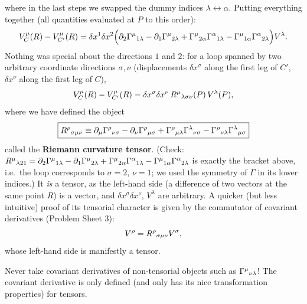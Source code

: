 where in the last steps we swapped the dummy indices $\lambda\leftrightarrow\alpha$. Putting everything together (all quantities evaluated at $P$ to this order):
\begin{equation}
  V_C^\mu(R)-V_{C'}^\mu(R)=\delta x^1\delta x^2\Big(\partial_2\Gamma^{\mu}{}_{1\lambda}-\partial_1\Gamma^{\mu}{}_{2\lambda}+\Gamma^{\mu}{}_{2\alpha}\Gamma^{\alpha}{}_{1\lambda}-\Gamma^{\mu}{}_{1\alpha}\Gamma^{\alpha}{}_{2\lambda}\Big)V^\lambda .
\end{equation}
Nothing was special about the directions $1$ and $2$: for a loop spanned by two arbitrary coordinate directions $\sigma,\nu$ (displacements $\delta x^\sigma$ along the first leg of $C'$, $\delta x^\nu$ along the first leg of $C$),
\begin{equation}
  V_C^\mu(R)-V_{C'}^\mu(R)=\delta x^\sigma\delta x^\nu\,R^{\mu}{}_{\lambda\sigma\nu}(P)\,V^\lambda(P),
\end{equation}
where we have defined the object
\begin{equation}
  \boxed{R^{\rho}{}_{\sigma\mu\nu}\equiv\partial_\mu\Gamma^{\rho}{}_{\nu\sigma}-\partial_\nu\Gamma^{\rho}{}_{\mu\sigma}+\Gamma^{\rho}{}_{\mu\lambda}\Gamma^{\lambda}{}_{\nu\sigma}-\Gamma^{\rho}{}_{\nu\lambda}\Gamma^{\lambda}{}_{\mu\sigma}}
  \label{eq:riemann}
\end{equation}
called the \textbf{Riemann curvature tensor}. (Check: $R^{\mu}{}_{\lambda21}=\partial_2\Gamma^{\mu}{}_{1\lambda}-\partial_1\Gamma^{\mu}{}_{2\lambda}+\Gamma^{\mu}{}_{2\alpha}\Gamma^{\alpha}{}_{1\lambda}-\Gamma^{\mu}{}_{1\alpha}\Gamma^{\alpha}{}_{2\lambda}$ is exactly the bracket above, i.e.\ the loop corresponds to $\sigma=2$, $\nu=1$; we used the symmetry of $\Gamma$ in its lower indices.) It \emph{is} a tensor, as the left-hand side (a difference of two vectors at the same point $R$) is a vector, and $\delta x^\sigma\delta x^\nu$, $V^\lambda$ are arbitrary. A quicker (but less intuitive) proof of its tensorial character is given by the commutator of covariant derivatives (Problem Sheet 3):
\begin{equation}
  [D_\mu,D_\nu]V^\rho=\Riem{\rho}{\sigma}{\mu}{\nu}V^\sigma ,
  \label{eq:commutator}
\end{equation}
whose left-hand side is manifestly a tensor.

\begin{warningbox}
Never take covariant derivatives of non-tensorial objects such as $\Gamma^{\mu}{}_{\nu\lambda}$! The covariant derivative is only defined (and only has its nice transformation properties) for tensors.
\end{warningbox}

